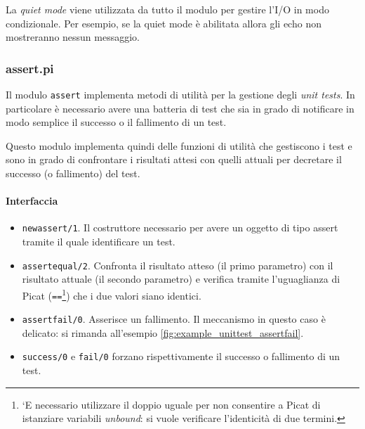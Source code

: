 \documentclass[12pt,a4paper,openright]{book}  %
\begin{document}
La \emph{quiet mode} viene utilizzata da tutto il modulo per gestire
l'I/O in modo condizionale. Per esempio, se la quiet mode è abilitata
allora gli echo non mostreranno nessun messaggio.

\subsubsection{assert.pi}

Il modulo \texttt{assert} implementa metodi di utilità per la gestione
degli \emph{unit tests}. In particolare è necessario avere una
batteria di test che sia in grado di notificare in modo semplice il
successo o il fallimento di un test.

Questo modulo implementa quindi delle funzioni di utilità che
gestiscono i test e sono in grado di confrontare i risultati attesi
con quelli attuali per decretare il successo (o fallimento) del test.

\paragraph{Interfaccia}
\begin{itemize}
	\item \texttt{new\textunderscore assert/1}. Il costruttore
          necessario per avere un oggetto di tipo assert tramite il
          quale identificare un test.
	\item \texttt{assert\textunderscore equal/2}. Confronta il
          risultato atteso (il primo parametro) con il risultato
          attuale (il secondo parametro) e verifica tramite
          l'uguaglianza di Picat (\texttt{==}\footnote{`E necessario
            utilizzare il doppio uguale per non consentire a Picat di
            istanziare variabili \emph{unbound}: si vuole verificare
            l'identicità di due termini.}) che i due valori siano
          identici.
	\item \texttt{assert\textunderscore fail/0}. Asserisce un
          fallimento. Il meccanismo in questo caso è delicato: si
          rimanda all'esempio \ref{fig:example_unittest_assertfail}.
	\item \texttt{success/0} e \texttt{fail/0} forzano
          rispettivamente il successo o fallimento di un test.
\end{itemize}
\end{document}
